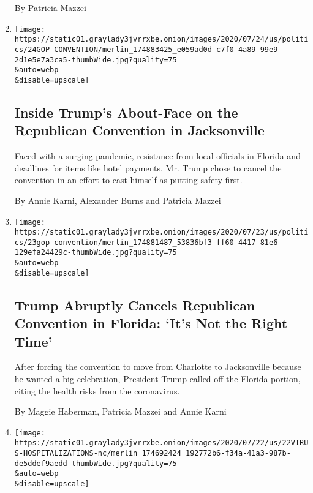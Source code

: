 \begin{enumerate}
  By Patricia Mazzei
\item
  \href{/2020/07/24/us/politics/trump-republican-convention-canceled-jacksonville.html}{}

  \texttt{[image: https://static01.graylady3jvrrxbe.onion/images/2020/07/24/us/politics/24GOP-CONVENTION/merlin\_174883425\_e059ad0d-c7f0-4a89-99e9-2d1e5e7a3ca5-thumbWide.jpg?quality=75\\\&auto=webp\\\&disable=upscale]}

  \hypertarget{inside-trumps-about-face-on-the-republican-convention-in-jacksonville}{%
  \subsection{Inside Trump's About-Face on the Republican Convention in
  Jacksonville}\label{inside-trumps-about-face-on-the-republican-convention-in-jacksonville}}

  Faced with a surging pandemic, resistance from local officials in
  Florida and deadlines for items like hotel payments, Mr. Trump chose
  to cancel the convention in an effort to cast himself as putting
  safety first.

  By Annie Karni, Alexander Burns and Patricia Mazzei
\item
  \href{/2020/07/23/us/politics/jacksonville-rnc.html}{}

  \texttt{[image: https://static01.graylady3jvrrxbe.onion/images/2020/07/23/us/politics/23gop-convention/merlin\_174881487\_53836bf3-ff60-4417-81e6-129efa24429c-thumbWide.jpg?quality=75\\\&auto=webp\\\&disable=upscale]}

  \hypertarget{trump-abruptly-cancels-republican-convention-in-florida-its-not-the-right-time}{%
  \subsection{Trump Abruptly Cancels Republican Convention in Florida:
  `It's Not the Right
  Time'}\label{trump-abruptly-cancels-republican-convention-in-florida-its-not-the-right-time}}

  After forcing the convention to move from Charlotte to Jacksonville
  because he wanted a big celebration, President Trump called off the
  Florida portion, citing the health risks from the coronavirus.

  By Maggie Haberman, Patricia Mazzei and Annie Karni
\item
  \href{/2020/07/22/us/coronavirus-hospitalizations-near-peak.html}{}

  \texttt{[image: https://static01.graylady3jvrrxbe.onion/images/2020/07/22/us/22VIRUS-HOSPITALIZATIONS-nc/merlin\_174692424\_192772b6-f34a-41a3-987b-de5ddef9aedd-thumbWide.jpg?quality=75\\\&auto=webp\\\&disable=upscale]}


\end{enumerate}
